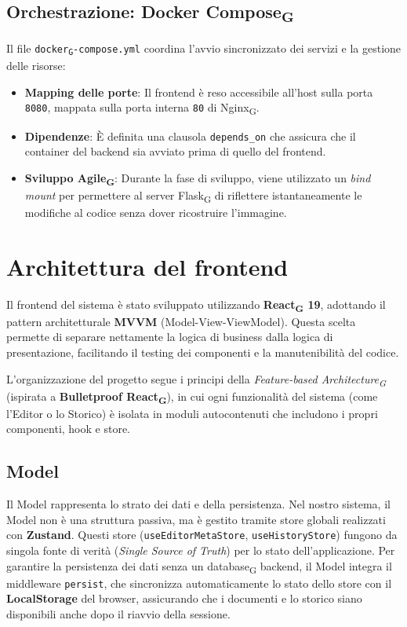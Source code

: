 \documentclass[11pt,a4paper]{article}
\newcommand{\gls}[1]{#1\textsubscript{G}}
\begin{document}
\subsection{Orchestrazione: \gls{Docker Compose}}
Il file \texttt{\gls{docker}-compose.yml} coordina l'avvio sincronizzato dei servizi e la gestione delle risorse:
\begin{itemize}
    \item \textbf{Mapping delle porte}: Il frontend è reso accessibile all'host sulla porta \texttt{8080}, mappata sulla porta interna \texttt{80} di \gls{Nginx}.
    \item \textbf{Dipendenze}: È definita una clausola \texttt{depends\_on} che assicura che il container del backend sia avviato prima di quello del frontend.
    \item \textbf{Sviluppo \gls{Agile}}: Durante la fase di sviluppo, viene utilizzato un \textit{bind mount} per permettere al server \gls{Flask} di riflettere istantaneamente le modifiche al codice senza dover ricostruire l'immagine.
\end{itemize}

\newpage

\section{Architettura del frontend}
Il frontend del sistema è stato sviluppato utilizzando \textbf{\gls{React} 19}, adottando il pattern architetturale \textbf{MVVM} (Model-View-ViewModel). Questa scelta permette di separare nettamente la logica di business dalla logica di presentazione, facilitando il testing dei componenti e la manutenibilità del codice.

L'organizzazione del progetto segue i principi della \textit{\gls{Feature-based Architecture}} (ispirata a \textbf{Bulletproof \gls{React}}), in cui ogni funzionalità del sistema (come l'Editor o lo Storico) è isolata in moduli autocontenuti che includono i propri componenti, hook e store.

\subsection{Model}
Il Model rappresenta lo strato dei dati e della persistenza. Nel nostro sistema, il Model non è una struttura passiva, ma è gestito tramite store globali realizzati con \textbf{Zustand}. Questi store (\texttt{useEditorMetaStore}, \texttt{useHistoryStore}) fungono da singola fonte di verità (\textit{Single Source of Truth}) per lo stato dell'applicazione.
Per garantire la persistenza dei dati senza un \gls{database} backend, il Model integra il middleware \texttt{persist}, che sincronizza automaticamente lo stato dello store con il \textbf{LocalStorage} del browser, assicurando che i documenti e lo storico siano disponibili anche dopo il riavvio della sessione.
\end{document}
